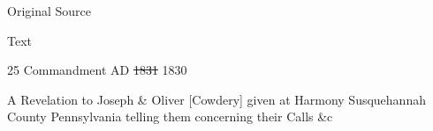 			\begin{description}
				\item[Original Source]
			\end{description}
			
			
			\begin{description}
				\item[Text]
			\end{description}
			
				\begin{tightcenter}
				25 Commandment AD \sout{1831} 1830
				\end{tightcenter}
				
				A Revelation to Joseph \& Oliver [Cowdery] given at Harmony Susquehannah County Pennsylvania telling them concerning their Calls \&c
				
